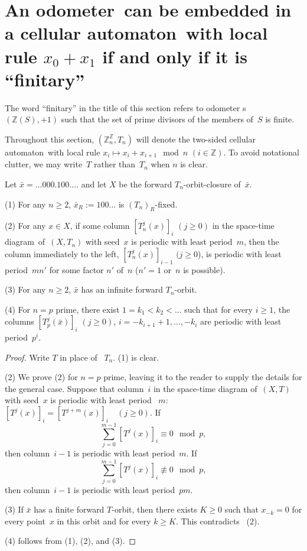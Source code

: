\documentclass[12pt]{amsart}
\begin{document}
\section*{An {odometer}\ can be embedded in a {cellular automaton}\ with local rule $x_0+x_1$ if and only if it is ``finitary''}

The word ``finitary'' in the title of this section refers to {odometer} s 
$({\mathbb Z}(S),+1)$ such that the set of prime divisors of the members of~$S$ is finite.

Throughout this section, 
$({\mathbb Z}_n^{\mathbb Z},T_n)$ will denote the two-sided {cellular automaton}\ with local rule
$x_i \mapsto x_i + x_{i+1} \mod n$
$(i \in {\mathbb Z})$.
To avoid notational clutter, we may write~$T$ 
rather than~$T_n$ when $n$ is clear.

\begin{lemma}
Let   $\bar x = \dots 000.100 \dots.$
and let $X$ be the forward $T_n$-orbit-closure of~$\bar x$.

\noindent (1) For any $n \ge 2$, $\bar x_R:= 100\dots$ is $(T_n)_R$-fixed. 

\noindent(2) For any $x \in X$,  if some column
$[T_n^j(x)]_i$ $(j\ge0)$ in the 
{space-time diagram}\ of~$(X,T_n)$ with seed~$x$ is periodic with least period~$m$, then the column
immediately to the left,
$[T_n^j(x)]_{i-1}$ $(j\ge0$),  is periodic with least period~$mn'$ for some factor $n'$ of~$n$ ($n' = 1$ or~$n$ is possible).

\noindent(3) For any $n \ge 2$,  
$\bar x$ has an infinite forward $T_n$-orbit.

\noindent(4) For $n = p$ prime, there exist
$1 = k_1 < k_2 < \dots$  such that for every $i \ge 1$,
the columns
$[T_p^j(\bar x)]_i$ $(j\ge0)$, $i =-k_{i+1}+1,\dots,-k_i$  are periodic with least period~$p^i$. 
\end{lemma}

\begin{proof}
Write $T$ in place of ~$T_n$.
\noindent (1) is clear.

\noindent (2)
We prove (2) for $n = p$ prime,
leaving it to the reader to supply the details for the general case.  Suppose that  column~$i$ in the space-time diagram of~$(X,T)$ with seed~$x$ is periodic with least period ~$m$:
$[T^j(x)]_i = 
[T^{j+m}(x)]_i \quad (j \ge 0)$.   
If
$$\sum_{j=0}^{m-1} [T^j(x)]_i \equiv 0 \mod p,$$
then column~$i-1$ is periodic with least period~$m$.
If 
$$\sum_{j=0}^{m-1} [T^j(x)]_i \not\equiv 0 \mod p,$$
then column~$i-1$ is periodic with least period~$pm$.

\smallskip
\noindent (3) If $\bar x$ has a finite forward $T$-orbit, then there exists 
$K\ge0$ such that $x_{-k}=0$ 
for every point~$x$ in this orbit
and for every $k \ge K$.
This contradicts ~(2).  

\smallskip
\noindent (4) follows from (1), (2), and (3). 
\end{proof}
\end{document}

